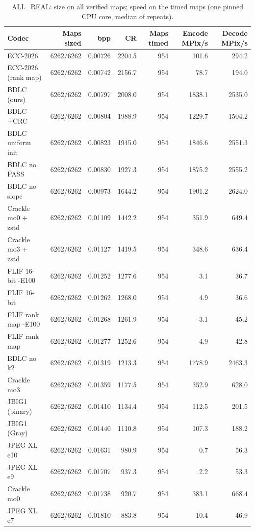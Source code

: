 \begin{table}[t]
\centering
\caption{ALL\_REAL: size on all verified maps; speed on the timed maps (one pinned CPU core, median of repeats).}
\begin{tabular}{lrrrrrr}
\hline
Codec & Maps sized & bpp & CR & Maps timed & Encode MPix/s & Decode MPix/s \\
\hline
ECC-2026 & 6262/6262 & 0.00726 & 2204.5 & 954 & 101.6 & 294.2 \\
ECC-2026 (rank map) & 6262/6262 & 0.00742 & 2156.7 & 954 & 78.7 & 194.0 \\
BDLC (ours) & 6262/6262 & 0.00797 & 2008.0 & 954 & 1838.1 & 2535.0 \\
BDLC +CRC & 6262/6262 & 0.00804 & 1988.9 & 954 & 1229.7 & 1504.2 \\
BDLC uniform init & 6262/6262 & 0.00823 & 1945.0 & 954 & 1846.6 & 2551.3 \\
BDLC no PASS & 6262/6262 & 0.00830 & 1927.3 & 954 & 1875.2 & 2555.2 \\
BDLC no slope & 6262/6262 & 0.00973 & 1644.2 & 954 & 1901.2 & 2624.0 \\
Crackle mo0 + zstd & 6262/6262 & 0.01109 & 1442.2 & 954 & 351.9 & 649.4 \\
Crackle mo3 + zstd & 6262/6262 & 0.01127 & 1419.5 & 954 & 348.6 & 636.4 \\
FLIF 16-bit -E100 & 6262/6262 & 0.01252 & 1277.6 & 954 & 3.1 & 36.7 \\
FLIF 16-bit & 6262/6262 & 0.01262 & 1268.0 & 954 & 4.9 & 36.6 \\
FLIF rank map -E100 & 6262/6262 & 0.01268 & 1261.9 & 954 & 3.1 & 45.2 \\
FLIF rank map & 6262/6262 & 0.01277 & 1252.6 & 954 & 4.9 & 42.8 \\
BDLC no k2 & 6262/6262 & 0.01319 & 1213.3 & 954 & 1778.9 & 2463.3 \\
Crackle mo3 & 6262/6262 & 0.01359 & 1177.5 & 954 & 352.9 & 628.0 \\
JBIG1 (binary) & 6262/6262 & 0.01410 & 1134.4 & 954 & 112.5 & 201.5 \\
JBIG1 (Gray) & 6262/6262 & 0.01440 & 1110.8 & 954 & 107.3 & 188.2 \\
JPEG XL e10 & 6262/6262 & 0.01631 & 980.9 & 954 & 0.7 & 56.3 \\
JPEG XL e9 & 6262/6262 & 0.01707 & 937.3 & 954 & 2.2 & 53.3 \\
Crackle mo0 & 6262/6262 & 0.01738 & 920.7 & 954 & 383.1 & 668.4 \\
JPEG XL e7 & 6262/6262 & 0.01810 & 883.8 & 954 & 10.4 & 46.9 \\

\end{tabular}
\end{table}
